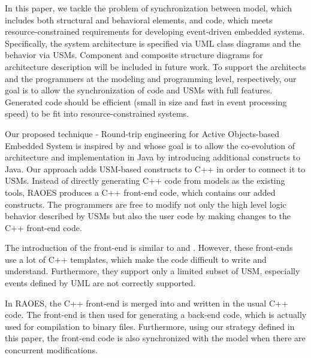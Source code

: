 In this paper, we tackle the problem of synchronization between model, which includes both structural and behavioral elements, and  code, which meets resource-constrained requirements for developing event-driven embedded systems.
Specifically, the system architecture is specified via UML class diagrams and the behavior via USMs.
Component and composite structure diagrams for architecture description will be included in future work.
To support the architects and the programmers at the modeling and programming level, respectively, our goal is to allow the synchronization of code and USMs with full features.
Generated code should be efficient (small in size and fast in event processing speed) to be fit into resource-constrained systems. 

Our proposed technique  - Round-trip engineering for Active Objects-based Embedded System is inspired by  \cite{aldrich2002archjava} and  \cite{ubayashi2010archface} whose goal is to allow the co-evolution of architecture and implementation in Java by introducing additional constructs to Java.
Our approach adds USM-based constructs to C++ in order to connect it to USMs.
Instead of directly generating C++ code from models as the existing tools, RAOES produces a C++ front-end code, which contains our added constructs.
The programmers are free to modify not only the high level logic behavior described by USMs but also the user code by making changes to the C++ front-end code.

The introduction of the front-end is similar to  \cite{MSM} and  \cite{EUML}.
However, these front-ends use a lot of C++ templates, which make the code difficult to write and understand.
Furthermore, they support only a limited subset of USM, especially events defined by UML are not correctly supported.

In RAOES, the C++ front-end is merged into and written in the usual C++ code.
The front-end is then used for generating a back-end code, which is actually used for compilation to binary files.
Furthermore, using our strategy defined in this paper, the front-end code is also synchronized with the model when there are concurrent modifications.


